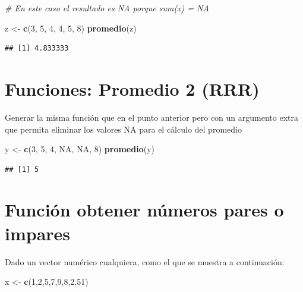 \documentclass[]{book}
\newenvironment{Shaded}{\begin{snugshade}}{\end{snugshade}}
\newcommand{\CommentTok}[1]{\textcolor[rgb]{0.56,0.35,0.01}{\textit{#1}}}
\newcommand{\DecValTok}[1]{\textcolor[rgb]{0.00,0.00,0.81}{#1}}
\newcommand{\KeywordTok}[1]{\textcolor[rgb]{0.13,0.29,0.53}{\textbf{#1}}}
\newcommand{\NormalTok}[1]{#1}
\newcommand{\OtherTok}[1]{\textcolor[rgb]{0.56,0.35,0.01}{#1}}
\newcommand{\StringTok}[1]{\textcolor[rgb]{0.31,0.60,0.02}{#1}}
\begin{document}
\begin{Shaded}
\begin{Highlighting}[]
\CommentTok{# En este caso el resultado es NA porque sum(x) = NA}

\NormalTok{z <-}\StringTok{ }\KeywordTok{c}\NormalTok{(}\DecValTok{3}\NormalTok{, }\DecValTok{5}\NormalTok{, }\DecValTok{4}\NormalTok{, }\DecValTok{4}\NormalTok{, }\DecValTok{5}\NormalTok{, }\DecValTok{8}\NormalTok{)}
\KeywordTok{promedio}\NormalTok{(z)}
\end{Highlighting}
\end{Shaded}

\begin{verbatim}
## [1] 4.833333
\end{verbatim}

\hypertarget{funciones-promedio-2-rrr}{%
\section{Funciones: Promedio 2 (RRR)}\label{funciones-promedio-2-rrr}}

Generar la misma función que en el punto anterior pero con un argumento extra que permita eliminar los valores NA para el cálculo del promedio

\begin{Shaded}
\begin{Highlighting}[]
\NormalTok{y <-}\StringTok{ }\KeywordTok{c}\NormalTok{(}\DecValTok{3}\NormalTok{, }\DecValTok{5}\NormalTok{, }\DecValTok{4}\NormalTok{, }\OtherTok{NA}\NormalTok{, }\OtherTok{NA}\NormalTok{, }\DecValTok{8}\NormalTok{)}
\KeywordTok{promedio}\NormalTok{(y)}
\end{Highlighting}
\end{Shaded}

\begin{verbatim}
## [1] 5
\end{verbatim}

\hypertarget{funciuxf3n-obtener-nuxfameros-pares-o-impares}{%
\section{Función obtener números pares o impares}\label{funciuxf3n-obtener-nuxfameros-pares-o-impares}}

Dado un vector numérico cualquiera, como el que se muestra a continuación:

\begin{Shaded}
\begin{Highlighting}[]
\NormalTok{x <-}\StringTok{ }\KeywordTok{c}\NormalTok{(}\DecValTok{1}\NormalTok{,}\DecValTok{2}\NormalTok{,}\DecValTok{5}\NormalTok{,}\DecValTok{7}\NormalTok{,}\DecValTok{9}\NormalTok{,}\DecValTok{8}\NormalTok{,}\DecValTok{2}\NormalTok{,}\DecValTok{51}\NormalTok{)}
\end{Highlighting}
\end{Shaded}
\end{document}
